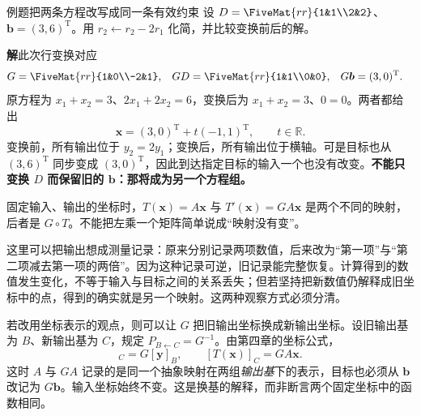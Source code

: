 \documentclass[a4paper,12pt,twoside,openany,fontset=none]{ctexbook}
\newcounter{example}[chapter]
\newenvironment{example}[1][]{\begin{exBox}{例题}{#1}}{\end{exBox}}
\numberwithin{equation}{chapter}
\begin{document}
\begin{example}[把两条方程改写成同一条有效约束]
设 $D=\FiveMat{rr}{1&1\\2&2}$、$\boldsymbol b=(3,6)^{\mathrm T}$。用 $r_2\leftarrow r_2-2r_1$ 化简，并比较变换前后的解。
\end{example}
\textbf{解}\quad 此次行变换对应
\begin{align}
 G&=\FiveMat{rr}{1&0\\-2&1},&
 GD&=\FiveMat{rr}{1&1\\0&0},&
 G\boldsymbol b&=(3,0)^{\mathrm T}.
\end{align}
原方程为 $x_1+x_2=3$、$2x_1+2x_2=6$，变换后为 $x_1+x_2=3$、$0=0$。两者都给出
\begin{equation}
 \boldsymbol x=(3,0)^{\mathrm T}+t(-1,1)^{\mathrm T},\qquad t\in\mathbb R.
\end{equation}
变换前，所有输出位于 $y_2=2y_1$；变换后，所有输出位于横轴。可是目标也从 $(3,6)^{\mathrm T}$ 同步变成 $(3,0)^{\mathrm T}$，因此到达指定目标的输入一个也没有改变。\textbf{不能只变换 $D$ 而保留旧的 $\boldsymbol b$：那将成为另一个方程组。}

固定输入、输出的坐标时，$T(\boldsymbol x)=A\boldsymbol x$ 与 $T'(\boldsymbol x)=GA\boldsymbol x$ 是两个不同的映射，后者是 $G\circ T$。不能把左乘一个矩阵简单说成“映射没有变”。

这里可以把输出想成测量记录：原来分别记录两项数值，后来改为“第一项”与“第二项减去第一项的两倍”。因为这种记录可逆，旧记录能完整恢复。计算得到的数值发生变化，不等于输入与目标之间的关系丢失；但若坚持把新数值仍解释成旧坐标中的点，得到的确实就是另一个映射。这两种观察方式必须分清。

若改用坐标表示的观点，则可以让 $G$ 把旧输出坐标换成新输出坐标。设旧输出基为 $B$、新输出基为 $C$，规定 $P_{B\leftarrow C}=G^{-1}$。由第四章的坐标公式，
\begin{equation}
 [\boldsymbol y]_C=G[\boldsymbol y]_B,
 \qquad [T(\boldsymbol x)]_C=GA\boldsymbol x.
\end{equation}
这时 $A$ 与 $GA$ 记录的是同一个抽象映射在两组\emph{输出基}下的表示，目标也必须从 $\boldsymbol b$ 改记为 $G\boldsymbol b$。输入坐标始终不变。这是换基的解释，而非断言两个固定坐标中的函数相同。
\end{document}
